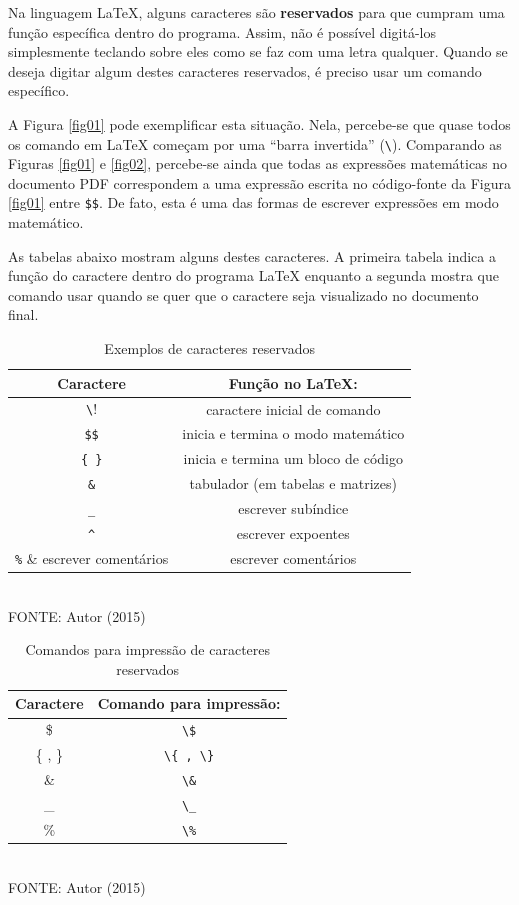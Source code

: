 Na linguagem LaTeX, alguns caracteres são \textbf{reservados} para que cumpram uma função específica dentro do programa. Assim, não é possível digitá-los simplesmente teclando sobre eles como se faz com uma letra qualquer. Quando se deseja digitar algum destes caracteres reservados, é preciso usar um comando específico. 

A Figura \ref{fig01} pode exemplificar esta situação.  Nela, percebe-se que quase todos os comando em LaTeX começam por uma ``barra invertida'' (\verb!\!). Comparando as Figuras \ref{fig01} e \ref{fig02}, percebe-se ainda que todas as expressões matemáticas no documento PDF correspondem a uma expressão escrita no código-fonte da Figura \ref{fig01} entre \verb!$$!. De fato, esta é uma das formas de escrever expressões em modo matemático. 

As tabelas abaixo mostram alguns destes caracteres. A primeira tabela indica a função do caractere dentro do programa LaTeX enquanto a segunda mostra que comando usar quando se quer que o caractere seja visualizado no documento final.
	\begin{table}
	\begin{center}
	\caption{Exemplos de caracteres reservados}
	\begin{tabular}{ c  c }
	\hline
	Caractere & Função no LaTeX:\\
	\hline
	\hline
	\verb!\! & caractere inicial de comando\\
	\verb!$$! & inicia e termina o modo matemático\\
	\verb!{ }! & inicia e termina um bloco de código\\
	\verb!&! & tabulador (em tabelas e matrizes)\\
	\verb!_! & escrever subíndice\\
	\verb!^! & escrever expoentes\\
	\verb!%! & escrever comentários\\
	\hline
	\end{tabular}\\ \vspace{0.25cm}
	FONTE: Autor (2015)
	\end{center}
	\end{table}

	
	\begin{table}
	\begin{center}
	\caption{Comandos para impressão de caracteres reservados}
	\begin{tabular}{ c  c }
	\hline
	Caractere & Comando para impressão:\\
	\hline
	\hline
	\$ & \verb!\$!\\
	\{ , \} & \verb!\{ , \}! \\
	\& & \verb!\&! \\
	\_ & \verb!\_! \\
	\% & \verb!\%! \\
	\hline
	\end{tabular}\\ \vspace{0.25cm}
	FONTE: Autor (2015)
	\end{center}
	\end{table}
	
